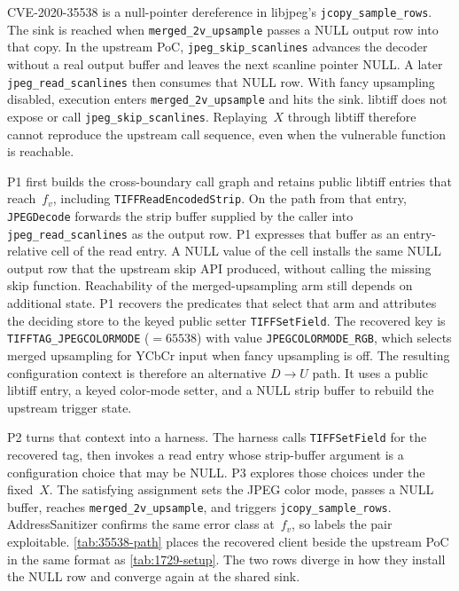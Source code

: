 CVE-2020-35538 is a null-pointer dereference in libjpeg's \texttt{jcopy\_sample\_rows}.
The sink is reached when \texttt{merged\_2v\_upsample} passes a NULL output row into that copy.
In the upstream PoC, \texttt{jpeg\_skip\_scanlines} advances the decoder without a real output buffer and leaves the next scanline pointer NULL.
A later \texttt{jpeg\_read\_scanlines} then consumes that NULL row.
With fancy upsampling disabled, execution enters \texttt{merged\_2v\_upsample} and hits the sink.
libtiff does not expose or call \texttt{jpeg\_skip\_scanlines}.
Replaying~$X$ through libtiff therefore cannot reproduce the upstream call sequence, even when the vulnerable function is reachable.

P1 first builds the cross-boundary call graph and retains public libtiff entries that reach~$f_v$, including \texttt{TIFFReadEncodedStrip}.
On the path from that entry, \texttt{JPEGDecode} forwards the strip buffer supplied by the caller into \texttt{jpeg\_read\_scanlines} as the output row.
P1 expresses that buffer as an entry-relative cell of the read entry.
A NULL value of the cell installs the same NULL output row that the upstream skip API produced, without calling the missing skip function.
Reachability of the merged-upsampling arm still depends on additional state.
P1 recovers the predicates that select that arm and attributes the deciding store to the keyed public setter \texttt{TIFFSetField}.
The recovered key is \texttt{TIFFTAG\_JPEGCOLORMODE} (${=}65538$) with value \texttt{JPEGCOLORMODE\_RGB}, which selects merged upsampling for YCbCr input when fancy upsampling is off.
The resulting configuration context is therefore an alternative $D{\to}U$ path.
It uses a public libtiff entry, a keyed color-mode setter, and a NULL strip buffer to rebuild the upstream trigger state.

P2 turns that context into a harness.
The harness calls \texttt{TIFFSetField} for the recovered tag, then invokes a read entry whose strip-buffer argument is a configuration choice that may be NULL.
P3 explores those choices under the fixed~$X$.
The satisfying assignment sets the JPEG color mode, passes a NULL buffer, reaches \texttt{merged\_2v\_upsample}, and triggers \texttt{jcopy\_sample\_rows}.
AddressSanitizer confirms the same error class at~$f_v$, so \sys labels the pair exploitable.
\autoref{tab:35538-path} places the recovered client beside the upstream PoC in the same format as \autoref{tab:1729-setup}.
The two rows diverge in how they install the NULL row and converge again at the shared sink.

